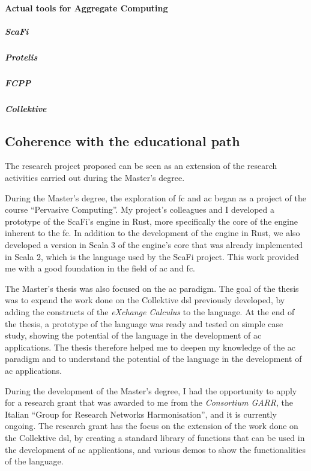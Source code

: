 \documentclass[12pt, a4paper]{article}
\newcommand{\note}[3]{\todo[inline,linecolor=#1,backgroundcolor=#1!25,bordercolor=#1]{\textbf{#2:} #3}}
\newcommand{\angela}[1]{\note{blue}{Angela}{#1}}
\begin{document}
\paragraph{Actual tools for Aggregate Computing}

\subparagraph{ScaFi}

\subparagraph{Protelis}

\subparagraph{FCPP}

\subparagraph{Collektive}


\subsection{Coherence with the educational path}\label{subsec:coherence-with-the-educational-path}

The research project proposed can be seen as an extension of the research activities carried out during the Master's degree.

During the Master's degree, the exploration of \ac{fc} and \ac{ac} began as a project of the course ``Pervasive Computing''.
%
My project's colleagues and I developed a prototype of the ScaFi's engine in Rust,
more specifically the core of the engine inherent to the \ac{fc}.
%
In addition to the development of the engine in Rust,
we also developed a version in Scala 3 of the engine's core that was already implemented in Scala 2,
which is the language used by the ScaFi project.
%
This work provided me with a good foundation in the field of \ac{ac} and \ac{fc}.

The Master's thesis was also focused on the \ac{ac} paradigm.
%
The goal of the thesis was to expand the work done on the Collektive \ac{dsl} previously developed,
by adding the constructs of the \emph{eXchange Calculus} to the language. \angela{todo explain xc and collektive?}
%
At the end of the thesis, a prototype of the language was ready and tested on simple case study,
showing the potential of the language in the development of \ac{ac} applications.
%
The thesis therefore helped me to deepen my knowledge of the \ac{ac} paradigm and to understand the potential
of the language in the development of \ac{ac} applications.

During the development of the Master's degree,
I had the opportunity to apply for a research grant that was awarded to me from the \emph{Consortium GARR},
the Italian ``Group for Research Networks Harmonisation'',
and it is currently ongoing.
%
The research grant has the focus on the extension of the work done on the Collektive \ac{dsl},
by creating a standard library of functions that can be used in the development of \ac{ac} applications,
and various demos to show the functionalities of the language.
\end{document}
